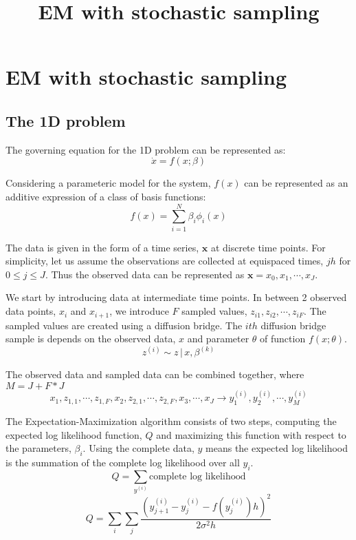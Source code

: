 \documentclass[12pt]{article}
\title{EM with stochastic sampling}
\begin{document}
\section{EM with stochastic sampling}
\subsection{The 1D problem}
The governing equation for the 1D problem can be represented as:
\begin{equation} \label{eqn:sde}
\dot{x} = f(x; \beta)
\end{equation}

Considering a parameteric model for the system, $f(x)$ can be represented as an additive expression of a class of basis functions:
\begin{equation} \label{eqn:parameteric}
f(x) = \sum_{i=1}^{N} \beta_i \phi_i (x)
\end{equation} 

The data is given in the form of a time series, $\mathbf{x}$ at discrete time points. For simplicity, let us assume the observations are collected at equispaced times, $jh$ for $0 \leq j \leq J$. Thus the observed data can be represented as $\mathbf{x} = x_0, x_1, \cdots, x_J$. 

We start by introducing data at intermediate time points. In between 2 observed data points, $x_i$ and $x_{i+1}$, we introduce $F$ sampled values, $z_{i1}, z_{i2}, \cdots, z_{iF}$. The sampled values are created using a diffusion bridge. The $i{th}$ diffusion bridge sample is depends on the observed data, $x$ and parameter $\theta$ of function $f(x; \theta)$.
\begin{equation}
z^{(i)} \sim z \, | \, x, \beta^{(k)}
\end{equation}

The observed data and sampled data can be combined together, where $M = J + F*J$
\begin{equation}
x_1, z_{1,1}, \cdots, z_{1,F}, x_2, z_{2,1}, \cdots, z_{2,F}, x_3, \cdots, x_J \rightarrow
y_1^{(i)}, y_2^{(i)}, \cdots, y_M^{(i)}
\end{equation}

The Expectation-Maximization algorithm consists of two steps, computing the expected log likelihood function, $Q$ and maximizing this function with respect to the parameters, $\beta_i$. Using the complete data, $y$ means the expected log likelihood is the summation of the complete log likelihood over all $y_i$.
$$
Q = \sum_{y^{(i)}} \text{complete log likelihood} $$
$$
Q = \sum_{i} \sum_{j} \frac{(y_{j+1}^{(i)} - y_j^{(i)} -f(y_j^{(i)})h)^2}{2 \sigma^2 h}
$$
\end{document}
